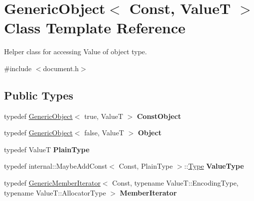 \hypertarget{class_generic_object}{}\section{Generic\+Object$<$ Const, ValueT $>$ Class Template Reference}
\label{class_generic_object}


Helper class for accessing Value of object type.  




{\ttfamily \#include $<$document.\+h$>$}

\subsection*{Public Types}
\begin{DoxyCompactItemize}
\item 
\mbox{\label{class_generic_object_aeee588f9a85e88cac89b7c4dfb6b0bd3}} 
typedef \hyperlink{class_generic_object}{Generic\+Object}$<$ true, ValueT $>$ {\bfseries Const\+Object}
\item 
\mbox{\label{class_generic_object_ae8f5673d0cf8e7ebfd2d4f6ab27b632d}} 
typedef \hyperlink{class_generic_object}{Generic\+Object}$<$ false, ValueT $>$ {\bfseries Object}
\item 
\mbox{\label{class_generic_object_a4c25f4a5f696745c418b91ad9f577f12}} 
typedef ValueT {\bfseries Plain\+Type}
\item 
\mbox{\label{class_generic_object_a930aa30f89caee7ba7bff60bf9dc21b1}} 
typedef internal\+::\+Maybe\+Add\+Const$<$ Const, Plain\+Type $>$\+::\hyperlink{rapidjson_8h_a1d1cfd8ffb84e947f82999c682b666a7}{Type} {\bfseries Value\+Type}
\item 
\mbox{\label{class_generic_object_a1f531d70f8d57ed30199ac445b5935e6}} 
typedef \hyperlink{class_generic_member_iterator}{Generic\+Member\+Iterator}$<$ Const, typename Value\+T\+::\+Encoding\+Type, typename Value\+T\+::\+Allocator\+Type $>$ {\bfseries Member\+Iterator}
\item 
\mbox{\label{class_generic_object_af16706c0ad32b957c56e7d0541628cd5}} 

\end{DoxyCompactItemize}
